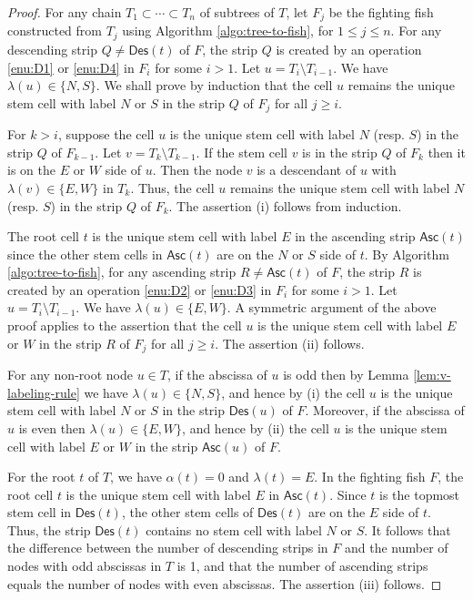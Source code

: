 \documentclass[a4paper,11pt,reqno]{amsart}
\theoremstyle{definition}
\numberwithin{equation}{section}
\newcommand{\Des}{{\textsf{Des}}}
\newcommand{\Asc}{{\textsf{Asc}}}
\begin{document}
\begin{proof}
For any chain $T_1\subset  \cdots \subset T_n$ of subtrees of $T$, let $F_j$ be the fighting fish constructed from $T_j$ using Algorithm \ref{algo:tree-to-fish}, for $1\le j\le n$. For any descending strip $Q\neq \Des(t)$ of $F$, the strip $Q$ is created by an operation \ref{enu:D1} or \ref{enu:D4} in $F_i$ for some $i>1$. Let $u=T_i\setminus T_{i-1}$. We have $\lambda(u)\in\{N,S\}$. We shall prove by induction that the cell $u$ remains the unique stem cell with label $N$ or $S$ in the strip $Q$ of $F_j$ for all $j\ge i$.

For $k>i$, suppose the cell $u$ is the unique stem cell with label $N$ (resp. $S$) in the strip $Q$ of $F_{k-1}$. Let $v=T_k\setminus T_{k-1}$. If the stem cell $v$ is in the strip $Q$ of $F_k$ then it is on the $E$ or $W$ side of $u$. Then the node $v$ is a descendant of $u$ with $\lambda(v)\in\{E,W\}$ in $T_k$. Thus, the cell $u$ remains the unique stem cell with label $N$ (resp. $S$) in the strip $Q$ of $F_k$. The assertion (i) follows from induction. 

The root cell $t$ is the unique stem cell with label $E$ in the ascending strip $\Asc(t)$ since the other stem cells in $\Asc(t)$ are on the $N$ or $S$ side of $t$. By Algorithm \ref{algo:tree-to-fish},
for any ascending strip $R\neq \Asc(t)$ of $F$, the strip $R$ is created by an operation \ref{enu:D2} or \ref{enu:D3} in $F_i$ for some $i>1$. Let $u=T_i\setminus T_{i-1}$. We have $\lambda(u)\in\{E,W\}$. A symmetric argument of the above proof applies to the assertion that the cell $u$ is the unique stem cell with label $E$ or $W$ in the strip $R$ of $F_j$ for all $j\ge i$. The assertion (ii) follows.

For any non-root node $u\in T$, if the abscissa of $u$ is odd then by Lemma \ref{lem:v-labeling-rule} we have $\lambda(u)\in\{N,S\}$, and hence by (i) the cell $u$ is the unique stem cell with label $N$ or $S$ in the strip $\Des(u)$ of $F$. Moreover, if the abscissa of $u$ is even then $\lambda(u)\in\{E,W\}$, and hence by (ii) the cell $u$ is the unique stem cell with label $E$ or $W$ in the strip $\Asc(u)$ of $F$. 

For the root $t$ of $T$, we have $\alpha(t)=0$ and $\lambda(t)=E$. In the fighting fish $F$, the root cell $t$ is the unique stem cell with label $E$ in $\Asc(t)$. Since $t$ is the topmost stem cell in $\Des(t)$, the other stem cells of $\Des(t)$ are on the $E$ side of $t$. Thus, the strip $\Des(t)$ contains no stem cell with label $N$ or $S$.
It follows that the difference between the number of descending strips in $F$ and the number of nodes with odd abscissas in $T$ is 1, and that the number of ascending strips equals the number of nodes with even abscissas. The assertion (iii) follows.
\end{proof}
\end{document}
